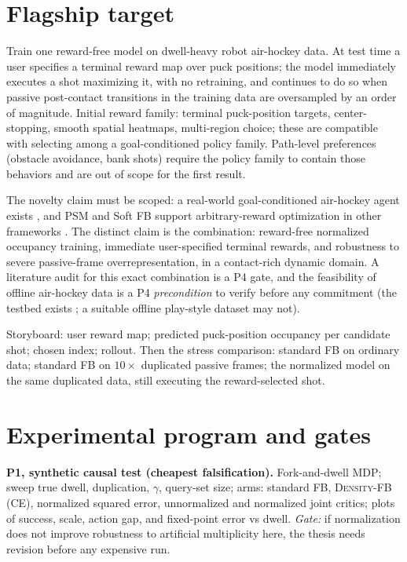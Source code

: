 \documentclass{article}
\newcommand{\DensityFB}{\textsc{Density-FB}}
\begin{document}
\section{Flagship target}
\label{sec:flagship}

Train one reward-free model on dwell-heavy robot air-hockey data.
At test time a user specifies a terminal reward map over puck positions; the model immediately executes a shot maximizing it, with no retraining, and continues to do so when passive post-contact transitions in the training data are oversampled by an order of magnitude.
Initial reward family: terminal puck-position targets, center-stopping, smooth spatial heatmaps, multi-region choice; these are compatible with selecting among a goal-conditioned policy family.
Path-level preferences (obstacle avoidance, bank shots) require the policy family to contain those behaviors and are out of scope for the first result.

The novelty claim must be scoped: a real-world goal-conditioned air-hockey agent exists \citep{shen2026interaction}, and PSM and Soft FB support arbitrary-reward optimization in other frameworks \citep{agarwal-rlj25a,bagatella2026softfb}.
The distinct claim is the combination: reward-free normalized occupancy training, immediate user-specified terminal rewards, and robustness to severe passive-frame overrepresentation, in a contact-rich dynamic domain.
A literature audit for this exact combination is a P4 gate, and the feasibility of offline air-hockey data is a P4 \emph{precondition} to verify before any commitment (the testbed exists \citep{chuck2024airhockey}; a suitable offline play-style dataset may not).

Storyboard: user reward map; predicted puck-position occupancy per candidate shot; chosen index; rollout.
Then the stress comparison: standard FB on ordinary data; standard FB on $10\times$ duplicated passive frames; the normalized model on the same duplicated data, still executing the reward-selected shot.

\section{Experimental program and gates}
\label{sec:program}

\textbf{P1, synthetic causal test (cheapest falsification).}
Fork-and-dwell MDP; sweep true dwell, duplication, $\gamma$, query-set size; arms: standard FB, \DensityFB{} (CE), normalized squared error, unnormalized and normalized joint critics; plots of success, scale, action gap, and fixed-point error vs dwell.
\emph{Gate:} if normalization does not improve robustness to artificial multiplicity here, the thesis needs revision before any expensive run.
\end{document}
